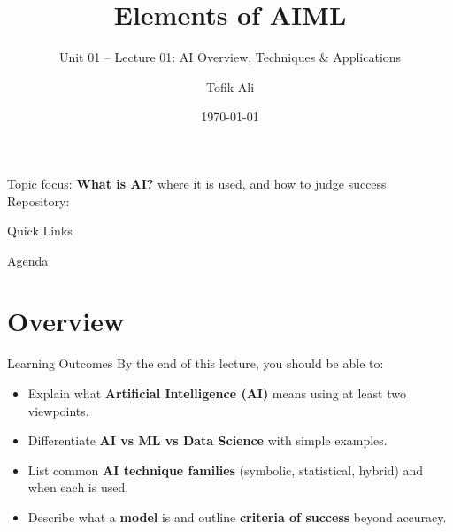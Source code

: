 \documentclass[aspectratio=169]{beamer}
\title[Elements of AIML]{Elements of AIML}
\subtitle{Unit 01 -- Lecture 01: AI Overview, Techniques \& Applications}
\author{Tofik Ali}
\institute{School of Computer Science, UPES Dehradun}
\date{\today}
\begin{document}
\UPESCoverFrame
\setcounter{framenumber}{0}

\begin{frame}
  \titlepage
  \vspace{0.3em}
  \begin{center}
    \footnotesize Topic focus: \textbf{What is AI?} where it is used, and how to judge success\\[0.25em]
    \footnotesize Repository: \texttt{\AIMLRepoURL}
  \end{center}
  \slidesources{\AIMLUnitISources}
\end{frame}

\begin{frame}{Quick Links}
  \centering
  \hyperlink{sec:overview}{}\hspace{0.6em}
  \hyperlink{sec:apps}{}\hspace{0.6em}
  \hyperlink{sec:models}{}\hspace{0.6em}
  \hyperlink{sec:example}{}\hspace{0.6em}
  \hyperlink{sec:summary}{}
\end{frame}

\begin{frame}{Agenda}
  \tableofcontents
\end{frame}

\section{Overview}
\label{sec:overview}

\begin{frame}{Learning Outcomes}
  By the end of this lecture, you should be able to:
  \begin{itemize}[<+->]
    \item Explain what \textbf{Artificial Intelligence (AI)} means using at least two viewpoints.
    \item Differentiate \textbf{AI vs ML vs Data Science} with simple examples.
    \item List common \textbf{AI technique families} (symbolic, statistical, hybrid) and when each is used.
    \item Describe what a \textbf{model} is and outline \textbf{criteria of success} beyond accuracy.
  \end{itemize}
\end{frame}
\end{document}
